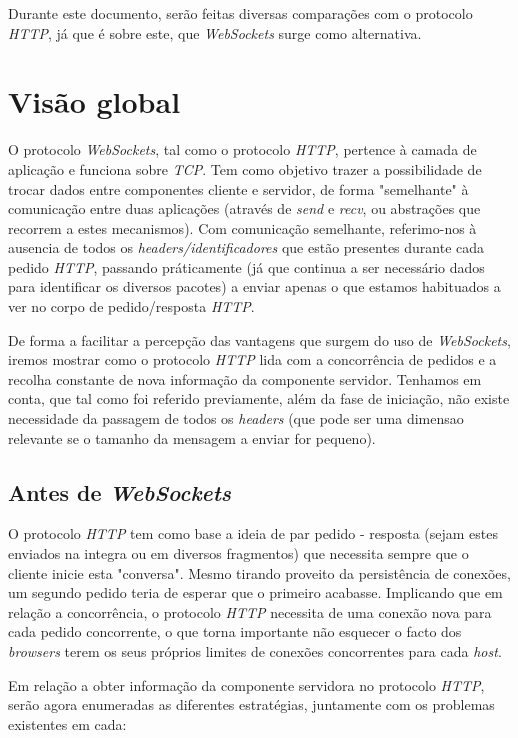 \documentclass[a4paper]{article}
\begin{document}
Durante este documento, serão feitas diversas comparações com o protocolo \emph{HTTP}, já que é sobre este, que \emph{WebSockets} surge como alternativa.

\section{Visão global}

O protocolo \emph{WebSockets}, tal como o protocolo \emph{HTTP}, pertence à camada de aplicação e funciona sobre \emph{TCP}. Tem como objetivo trazer a possibilidade de trocar dados entre componentes cliente e servidor, de forma "semelhante" à comunicação entre duas aplicações (através de \emph{send} e \emph{recv}, ou abstrações que recorrem a estes mecanismos). Com comunicação semelhante, referimo-nos à ausencia de todos os \emph{headers/identificadores} que estão presentes durante cada pedido \emph{HTTP}, passando práticamente (já que continua a ser necessário dados para identificar os diversos pacotes) a enviar apenas o que estamos habituados a ver no corpo de pedido/resposta \emph{HTTP}.

De forma a facilitar a percepção das vantagens que surgem do uso de \emph{WebSockets}, iremos mostrar como o protocolo \emph{HTTP} lida com a  concorrência de pedidos e a recolha constante de nova informação da componente servidor. Tenhamos em conta, que tal como foi referido previamente, além da fase de iniciação, não existe necessidade da passagem de todos os \emph{headers} (que pode ser uma dimensao relevante se o tamanho da mensagem a enviar for pequeno).

\subsection{Antes de \emph{WebSockets}}

O protocolo \emph{HTTP} tem como base a ideia de par pedido - resposta (sejam estes enviados na integra ou em diversos fragmentos) que necessita sempre que o cliente inicie esta "conversa". Mesmo tirando proveito da persistência de conexões, um segundo pedido teria de esperar que o primeiro acabasse. Implicando que em relação a concorrência, o protocolo \emph{HTTP} necessita de uma conexão nova para cada pedido concorrente, o que torna importante não esquecer o facto dos \emph{browsers} terem os seus próprios limites de conexões concorrentes para cada \emph{host}.

Em relação a obter informação da componente servidora no protocolo \emph{HTTP}, serão agora enumeradas as diferentes estratégias,  juntamente com os problemas existentes em cada:
\end{document}
